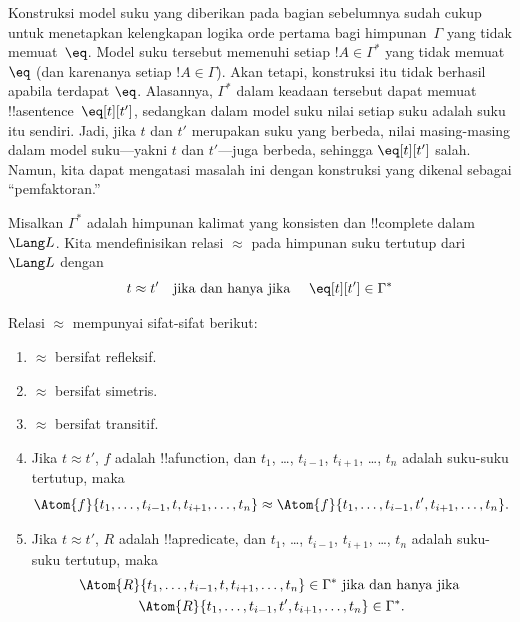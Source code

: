\documentclass[../../../include/open-logic-section]{subfiles}
\begin{document}

\begin{explain}
Konstruksi model suku yang diberikan pada bagian sebelumnya sudah cukup
untuk menetapkan kelengkapan logika orde pertama bagi himpunan~$\Gamma$
yang tidak memuat~$\eq$. Model suku tersebut memenuhi setiap $!A \in
\Gamma^*$ yang tidak memuat~$\eq$ (dan karenanya setiap $!A \in
\Gamma$). Akan tetapi, konstruksi itu tidak berhasil apabila terdapat
$\eq$. Alasannya, $\Gamma^*$ dalam keadaan tersebut dapat memuat
!!a{sentence}~$\eq[t][t']$, sedangkan dalam model suku nilai setiap suku
adalah suku itu sendiri. Jadi, jika $t$ dan $t'$ merupakan suku yang
berbeda, nilai masing-masing dalam model suku---yakni $t$ dan $t'$---juga
berbeda, sehingga $\eq[t][t']$ salah. Namun, kita dapat mengatasi masalah
ini dengan konstruksi yang dikenal sebagai ``pemfaktoran.''
\end{explain}

\begin{defn}
  Misalkan $\Gamma^*$ adalah himpunan kalimat yang konsisten dan
  !!{complete} dalam~$\Lang L$. Kita mendefinisikan relasi $\approx$
  pada himpunan suku tertutup dari~$\Lang L$ dengan
  \[
  t \approx t' \text{\quad jika dan hanya jika \quad} \eq[t][t'] \in \Gamma^*
  \]
\end{defn}

\begin{prop}
Relasi $\approx$ mempunyai sifat-sifat berikut:
\begin{enumerate}
\item $\approx$ bersifat refleksif.
\item $\approx$ bersifat simetris.
\item $\approx$ bersifat transitif.
\item Jika $t \approx t'$, $f$ adalah !!a{function}, dan $t_1$, \dots,
  $t_{i-1}$, $t_{i+1}$, \dots, $t_n$ adalah suku-suku tertutup, maka
\[
\Atom{f}{t_1,\dots, t_{i-1}, t, t_{i+1}, \dots, t_n} \approx
\Atom{f}{t_1,\dots, t_{i-1}, t', t_{i+1}, \dots, t_n}.
\]
\item Jika $t \approx t'$, $R$ adalah !!a{predicate}, dan $t_1$, \dots,
  $t_{i-1}$, $t_{i+1}$, \dots, $t_n$ adalah suku-suku tertutup, maka
\begin{multline*}
\Atom{R}{t_1,\dots, t_{i-1}, t, t_{i+1}, \dots, t_n} \in \Gamma^* \text{ jika dan hanya jika } \\
\Atom{R}{t_1,\dots, t_{i-1}, t', t_{i+1}, \dots, t_n} \in \Gamma^*.
\end{multline*}
\end{enumerate}
\end{prop}
\end{document}
